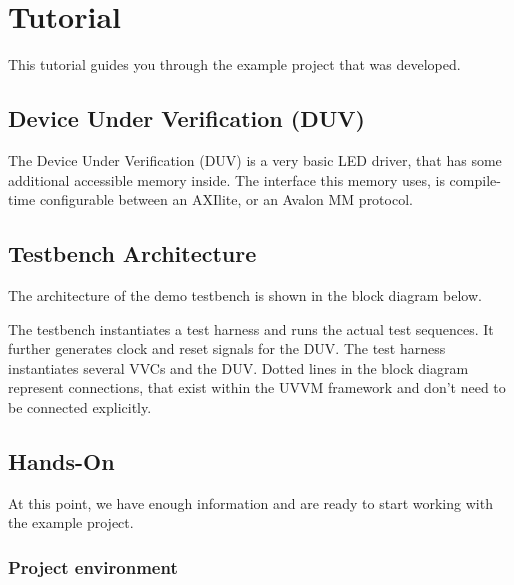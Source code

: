 \section{Tutorial}

This tutorial guides you through the example project that was developed.

\subsection{Device Under Verification (DUV)}

The Device Under Verification (DUV) is a very basic LED driver, that has some additional accessible memory inside. The interface this memory uses, is compile-time configurable between an AXIlite, or an Avalon MM protocol.


\subsection{Testbench Architecture}

The architecture of the demo testbench is shown in the block diagram below.


The testbench instantiates a test harness and runs the actual test sequences. It further generates clock and reset signals for the DUV.
The test harness instantiates several VVCs and the DUV. Dotted lines in the block diagram represent connections, that exist within the UVVM framework and don't need to be connected explicitly.

\subsection{Hands-On}

At this point, we have enough information and are ready to start working with the example project.

\subsubsection{Project environment}

